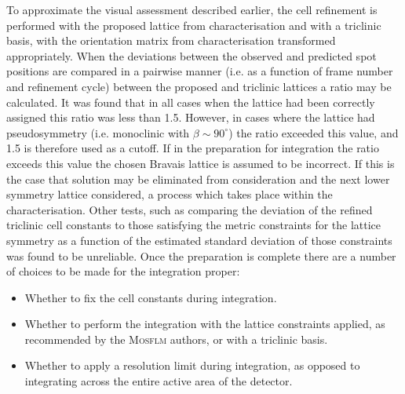 \documentclass[preprint,pdf]{iucr}
\begin{document}
To approximate the visual assessment described earlier, the cell
refinement is performed with the proposed lattice from
characterisation and with a triclinic 
basis, with the orientation matrix from
characterisation transformed appropriately. When the deviations
between the observed and predicted spot positions are compared in a
pairwise manner (i.e. as a function of frame number and refinement
cycle) between the proposed and triclinic lattices
a ratio may be calculated. It was found that in
all cases when the lattice had been correctly assigned this ratio was
less than 1.5. However, in cases where the lattice had pseudosymmetry
(i.e. monoclinic with $\beta \sim 90^{\circ}$)
the ratio exceeded this value, and 1.5 is therefore used as a
cutoff. If in the preparation for integration
the ratio exceeds this value the chosen Bravais lattice
is assumed to be incorrect. If this is the case that solution may be
eliminated from consideration and the next lower symmetry lattice
considered, a process which takes place within the characterisation.
Other tests, such as comparing the deviation of the refined triclinic
cell constants to those satisfying the metric constraints for the 
lattice symmetry as a function
of the estimated standard deviation of those constraints was found to
be unreliable. Once the preparation is complete there are a number of
choices to be made for the integration proper:

\begin{itemize}
\item{Whether to fix the cell constants during integration.}
\item{Whether to perform the integration with the lattice constraints
    applied, as recommended by the \textsc{Mosflm} authors, or with a triclinic
    basis.}
\item{Whether to apply a resolution limit during integration,
    as opposed to integrating across the entire active area of the detector.}
\end{itemize}
\end{document}
